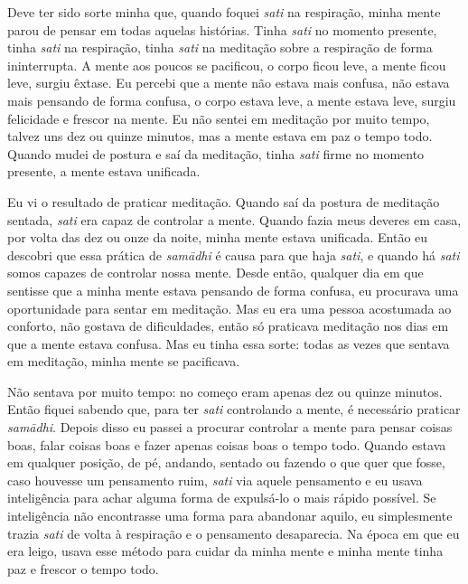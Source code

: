 Deve ter sido sorte minha que, quando foquei \textit{sati }na
respiração, minha mente parou de pensar em todas aquelas histórias.
Tinha \textit{sati }no momento presente, tinha \textit{sati }na
respiração, tinha \textit{sati }na meditação sobre a respiração de
forma ininterrupta. A mente aos poucos se pacificou, o corpo ficou
leve, a mente ficou leve, surgiu êxtase. Eu percebi que a mente não
estava mais confusa, não estava mais pensando de forma confusa, o corpo
estava leve, a mente estava leve, surgiu felicidade e frescor na mente.
Eu não sentei em meditação por muito tempo, talvez uns dez ou quinze
minutos, mas a mente estava em paz o tempo todo. Quando mudei de
postura e saí da meditação, tinha \textit{sati }firme no momento
presente, a mente estava unificada.

Eu vi o resultado de praticar meditação. Quando saí da postura de
meditação sentada, \textit{sati }era capaz de controlar a mente. Quando
fazia meus deveres em casa, por volta das dez ou onze da noite, minha
mente estava unificada. Então eu descobri que essa prática de
\textit{samādhi }é causa para que haja \textit{sati}, e quando há
\textit{sati }somos capazes de controlar nossa mente. Desde então,
qualquer dia em que sentisse que a minha mente estava pensando de forma
confusa, eu procurava uma oportunidade para sentar em meditação. Mas eu
era uma pessoa acostumada ao conforto, não gostava de dificuldades,
então só praticava meditação nos dias em que a mente estava confusa.
Mas eu tinha essa sorte: todas as vezes que sentava em meditação, minha
mente se pacificava.

Não sentava por muito tempo: no começo eram apenas dez ou quinze
minutos. Então fiquei sabendo que, para ter \textit{sati }controlando a
mente, é necessário praticar \textit{samādhi}. Depois disso eu passei
a procurar controlar a mente para pensar coisas boas, falar coisas boas
e fazer apenas coisas boas o tempo todo. Quando estava em qualquer
posição, de pé, andando, sentado ou fazendo o que quer que fosse, caso
houvesse um pensamento ruim, \textit{sati }via aquele pensamento e eu
usava inteligência para achar alguma forma de expulsá-lo o mais rápido
possível. Se inteligência não encontrasse uma forma para abandonar
aquilo, eu simplesmente trazia \textit{sati }de volta à respiração e o
pensamento desaparecia. Na época em que eu era leigo, usava esse método
para cuidar da minha mente e minha mente tinha paz e frescor o tempo
todo.

